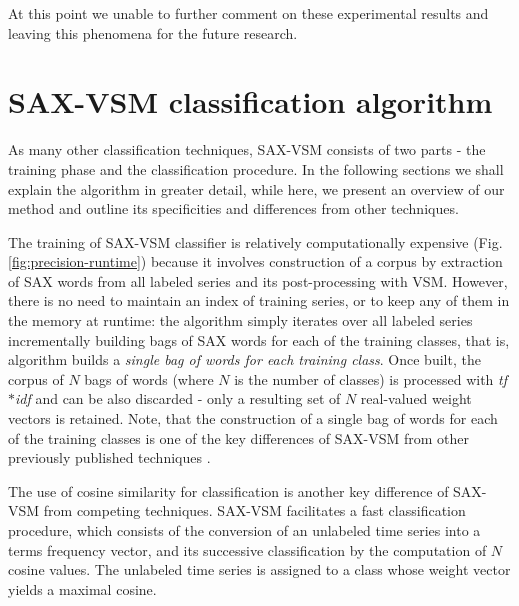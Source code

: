 \documentclass{llncs}
\begin{document}
At this point we unable to further comment on these experimental results and 
leaving this phenomena for the future research.

\section{SAX-VSM classification algorithm }
As many other classification techniques, SAX-VSM consists of two parts - the training
phase and the classification procedure. In the following sections we shall explain 
the algorithm in greater detail, while here, we present an overview of our method 
and outline its specificities and differences from other techniques.

The training of SAX-VSM classifier is relatively computationally expensive 
(Fig. \ref{fig:precision-runtime}) because it involves construction of a corpus by
extraction of SAX words from all labeled series and its post-processing with VSM. 
However, there is no need to maintain an index of training series, or to keep any of 
them in the memory at runtime: the algorithm simply iterates over all labeled series
incrementally building bags of SAX words for each of the training classes, 
that is, algorithm builds a \textit{single bag of words for each training class}. 
Once built, the corpus of $N$ bags of words (where $N$ is the number of classes) is
processed with \textit{tf$\ast$idf} and can be also discarded - only a resulting set of $N$ 
real-valued weight vectors is retained. 
Note, that the construction of a single bag of words for each of the training classes 
is one of the key differences of SAX-VSM from other previously published 
techniques \cite{bag_patterns}.

The use of cosine similarity for classification is another key difference of SAX-VSM 
from competing techniques. SAX-VSM facilitates a fast classification procedure, 
which consists of the conversion of an unlabeled time series into a terms 
frequency vector, and its successive classification by the computation of $N$ cosine 
values. The unlabeled time series is assigned to a class whose weight vector 
yields a maximal cosine. 
\end{document}
